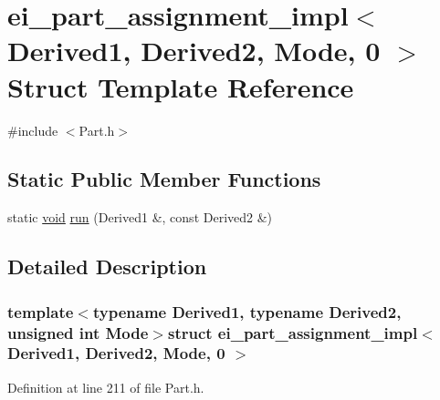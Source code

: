 \hypertarget{structei__part__assignment__impl_3_01_derived1_00_01_derived2_00_01_mode_00_010_01_4}{\section{ei\-\_\-part\-\_\-assignment\-\_\-impl$<$ Derived1, Derived2, Mode, 0 $>$ Struct Template Reference}
\label{structei__part__assignment__impl_3_01_derived1_00_01_derived2_00_01_mode_00_010_01_4}
}


{\ttfamily \#include $<$Part.\-h$>$}

\subsection*{Static Public Member Functions}
\begin{DoxyCompactItemize}
\item 
static \hyperlink{group___u_a_v_objects_plugin_ga444cf2ff3f0ecbe028adce838d373f5c}{void} \hyperlink{structei__part__assignment__impl_3_01_derived1_00_01_derived2_00_01_mode_00_010_01_4_a3345e2a40424971e915c63b30023954b}{run} (Derived1 \&, const Derived2 \&)
\end{DoxyCompactItemize}


\subsection{Detailed Description}
\subsubsection*{template$<$typename Derived1, typename Derived2, unsigned int Mode$>$struct ei\-\_\-part\-\_\-assignment\-\_\-impl$<$ Derived1, Derived2, Mode, 0 $>$}



Definition at line 211 of file Part.\-h.



